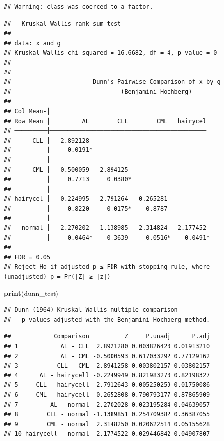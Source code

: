\documentclass[
]{article}
\newenvironment{Shaded}{\begin{snugshade}}{\end{snugshade}}
\newcommand{\FunctionTok}[1]{\textcolor[rgb]{0.13,0.29,0.53}{\textbf{#1}}}
\newcommand{\NormalTok}[1]{#1}
\begin{document}
\begin{verbatim}
## Warning: class was coerced to a factor.
\end{verbatim}

\begin{verbatim}
##   Kruskal-Wallis rank sum test
## 
## data: x and g
## Kruskal-Wallis chi-squared = 16.6682, df = 4, p-value = 0
## 
## 
##                       Dunn's Pairwise Comparison of x by g                      
##                               (Benjamini-Hochberg)                              
## 
## Col Mean-│
## Row Mean │         AL        CLL        CML   hairycel
## ─────────┼────────────────────────────────────────────
##      CLL │   2.892128
##          │     0.0191*
##          │
##      CML │  -0.500059  -2.894125
##          │     0.7713     0.0380*
##          │
## hairycel │  -0.224995  -2.791264   0.265281
##          │     0.8220     0.0175*    0.8787 
##          │
##   normal │   2.270202  -1.138985   2.314824   2.177452
##          │     0.0464*    0.3639     0.0516*    0.0491*
## 
## FDR = 0.05
## Reject Ho if adjusted p ≤ FDR with stopping rule, where (unadjusted) p = Pr(|Z| ≥ |z|)
\end{verbatim}

\begin{Shaded}
\begin{Highlighting}[]
\FunctionTok{print}\NormalTok{(dunn\_test)}
\end{Highlighting}
\end{Shaded}

\begin{verbatim}
## Dunn (1964) Kruskal-Wallis multiple comparison
##   p-values adjusted with the Benjamini-Hochberg method.
\end{verbatim}

\begin{verbatim}
##            Comparison          Z     P.unadj      P.adj
## 1            AL - CLL  2.8921280 0.003826420 0.01913210
## 2            AL - CML -0.5000593 0.617033292 0.77129162
## 3           CLL - CML -2.8941258 0.003802157 0.03802157
## 4      AL - hairycell -0.2249949 0.821983270 0.82198327
## 5     CLL - hairycell -2.7912643 0.005250259 0.01750086
## 6     CML - hairycell  0.2652808 0.790793177 0.87865909
## 7         AL - normal  2.2702028 0.023195284 0.04639057
## 8        CLL - normal -1.1389851 0.254709382 0.36387055
## 9        CML - normal  2.3148250 0.020622514 0.05155628
## 10 hairycell - normal  2.1774522 0.029446842 0.04907807
\end{verbatim}
\end{document}
